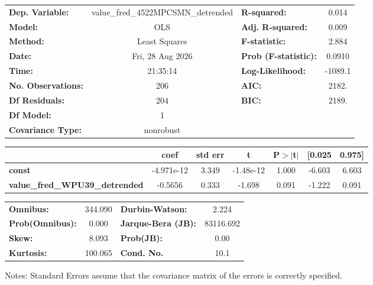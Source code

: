 \begin{center}
\begin{tabular}{lclc}
\toprule
\textbf{Dep. Variable:}                & value\_fred\_4522MPCSMN\_detrended & \textbf{  R-squared:         } &     0.014   \\
\textbf{Model:}                        &                OLS                 & \textbf{  Adj. R-squared:    } &     0.009   \\
\textbf{Method:}                       &           Least Squares            & \textbf{  F-statistic:       } &     2.884   \\
\textbf{Date:}                         &          Fri, 28 Aug 2026          & \textbf{  Prob (F-statistic):} &   0.0910    \\
\textbf{Time:}                         &              21:35:14              & \textbf{  Log-Likelihood:    } &   -1089.1   \\
\textbf{No. Observations:}             &                  206               & \textbf{  AIC:               } &     2182.   \\
\textbf{Df Residuals:}                 &                  204               & \textbf{  BIC:               } &     2189.   \\
\textbf{Df Model:}                     &                    1               & \textbf{                     } &             \\
\textbf{Covariance Type:}              &             nonrobust              & \textbf{                     } &             \\
\bottomrule
\end{tabular}
\begin{tabular}{lcccccc}
                                       & \textbf{coef} & \textbf{std err} & \textbf{t} & \textbf{P$> |$t$|$} & \textbf{[0.025} & \textbf{0.975]}  \\
\midrule
\textbf{const}                         &   -4.971e-12  &        3.349     & -1.48e-12  &         1.000        &       -6.603    &        6.603     \\
\textbf{value\_fred\_WPU39\_detrended} &      -0.5656  &        0.333     &    -1.698  &         0.091        &       -1.222    &        0.091     \\
\bottomrule
\end{tabular}
\begin{tabular}{lclc}
\textbf{Omnibus:}       & 344.090 & \textbf{  Durbin-Watson:     } &     2.224  \\
\textbf{Prob(Omnibus):} &   0.000 & \textbf{  Jarque-Bera (JB):  } & 83116.692  \\
\textbf{Skew:}          &   8.093 & \textbf{  Prob(JB):          } &      0.00  \\
\textbf{Kurtosis:}      & 100.065 & \textbf{  Cond. No.          } &      10.1  \\
\bottomrule
\end{tabular}
\end{center}

Notes: \newline
 [1] Standard Errors assume that the covariance matrix of the errors is correctly specified.